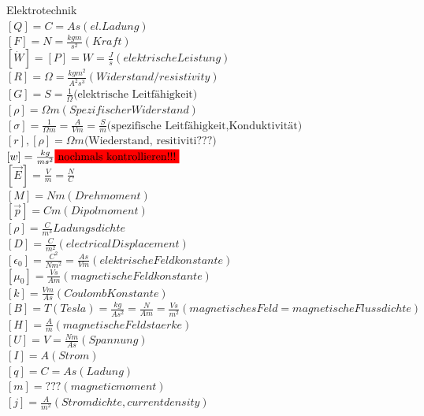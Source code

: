 \documentclass[a4paper]{scrartcl}
\begin{document}
Elektrotechnik\\
$ [Q]=C=As (el. Ladung)$\\
$ [F]=N=\frac{kg m}{s^2} (Kraft)$\\
$ [\dot W]=[P]=W=\frac{J}{s} (elektrische Leistung)$\\
$ [R] = \Omega = \frac{kg m^2}{A^2 s^3} (Widerstand/resistivity) $\\
$ [G] = S = \frac{1}{\Omega} \text{(elektrische Leitfähigkeit)}$\\
$ [\rho] = \Omega m (Spezifischer Widerstand)$\\
$ [\sigma] = \frac{1}{\Omega m} = \frac{A}{Vm} = \frac{S}{m} \text{(spezifische Leitfähigkeit,Konduktivität)} $\\
$ [r] , [\rho]= \Omega m \text{(Wiederstand, resitiviti???)} $\\
$ [w]=\frac{kg}{ms^2} \colorbox{red}{nochmals kontrollieren!!!} $\\
$ [\vec E]=\frac{V}{m} = \frac{N}{C}$\\
$ [M]=Nm (Drehmoment)$\\
$ [\vec p]=Cm (Dipolmoment)$\\
$ [\rho]=\frac{C}{m^3} Ladungsdichte$\\
$ [D]=\frac{C}{m^2} (electrical Displacement)$\\
$ [\epsilon_0]= \frac{C^2}{Nm^2}=\frac{As}{Vm} (elektrische Feldkonstante)$\\
$ [\mu_0] = \frac{Vs}{Am} (magnetische Feldkonstante)$\\
$ [k] = \frac{Vm}{As} (Coulomb Konstante)$\\
$ [B]= T (Tesla) = \frac{kg}{As^2} = \frac{N}{Am} = \frac{Vs}{m^2} (magnetisches
Feld = magnetische Flussdichte)$\\
$ [H]= \frac{A}{m} (magnetische Feldstaerke)$\\
$ [U]= V = \frac{Nm}{As} (Spannung) $\\
$ [I]= A (Strom) $\\
$ [q]= C = As (Ladung)$\\
$ [m]= ??? (magnetic moment)$\\
$ [j]= \frac{A}{m^2} (Stromdichte, current density)$\\
\end{document}
